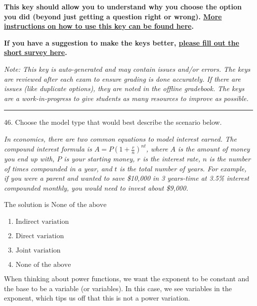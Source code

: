\documentclass{article}[14pt]
\begin{document}
\textbf{This key should allow you to understand why you choose the option you did (beyond just getting a question right or wrong). \href{https://xronos.clas.ufl.edu/mac1105spring2020/courseDescriptionAndMisc/Exams/LearningFromResults}{More instructions on how to use this key can be found here}.}

\textbf{If you have a suggestion to make the keys better, \href{https://forms.gle/CZkbZmPbC9XALEE88}{please fill out the short survey here}.}

\textit{Note: This key is auto-generated and may contain issues and/or errors. The keys are reviewed after each exam to ensure grading is done accurately. If there are issues (like duplicate options), they are noted in the offline gradebook. The keys are a work-in-progress to give students as many resources to improve as possible.}

\rule{\textwidth}{0.4pt}

46. Choose the model type that would best describe the scenario below.
\begin{center} \textit{In economics, there are two common equations to model interest earned. The compound interest formula is $A = P (1 + \frac{r}{n})^{nt}$, where $A$ is the amount of money you end up with, $P$ is your starting money, $r$ is the interest rate, $n$ is the number of times compounded in a year, and $t$ is the total number of years. For example, if you were a parent and wanted to save \$10,000 in 3 years-time at 3.5\% interest compounded monthly, you would need to invest about \$9,000.} \end{center} 
The solution is $ \text{None of the above} $ 

\begin{enumerate}[label=\Alph*.] 
\item $ \text{Indirect variation} $ 

  
\item $ \text{Direct variation} $ 

  
\item $ \text{Joint variation} $ 

  
\item $ \text{None of the above} $ 

  
\end{enumerate} 
 
When thinking about power functions, we want the exponent to be constant and the base to be a variable (or variables). In this case, we see variables in the exponent, which tips us off that this is not a power variation.
\end{document}
